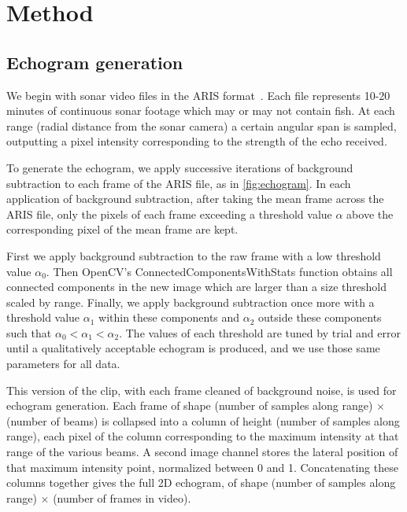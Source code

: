 \section{Method}

\subsection{Echogram generation}
\label{sec:echogram}

We begin with sonar video files in the ARIS format~\cite{soundmetrics_ARIS}. Each file represents 10-20 minutes of continuous sonar footage which may or may not contain fish. At each range (radial distance from the sonar camera) a certain angular span is sampled, %
outputting a pixel intensity corresponding to the strength of the echo received. 

To generate the echogram, we apply successive iterations of background subtraction to each frame of the ARIS file, as in \cref{fig:echogram}. In each application of background subtraction, after taking the mean frame across the ARIS file, only the pixels of each frame exceeding a threshold value $\alpha$ above the corresponding pixel of the mean frame are kept. 

First we apply background subtraction to the raw frame with a low threshold value $\alpha_0$. Then OpenCV's ConnectedComponentsWithStats function obtains all connected components in the new image which are larger than a size threshold scaled by range. Finally, we apply background subtraction once more with a threshold value $\alpha_1$ within these components and $\alpha_2$ outside these components such that $\alpha_0 < \alpha_1 < \alpha_2$.
The values of each threshold are tuned by trial and error until a qualitatively acceptable echogram is produced, and we use those same parameters for all data.


This version of the clip, with each frame cleaned of background noise, is used for echogram generation. Each frame of shape (number of samples along range) $\times$ (number of beams) is collapsed into a column of height (number of samples along range), each pixel of the column corresponding to the maximum intensity at that range of the various beams. A second image channel stores the lateral position of that maximum intensity point, normalized between 0 and 1. Concatenating these columns together gives the full 2D echogram, of shape (number of samples along range) $\times$ (number of frames in video).

